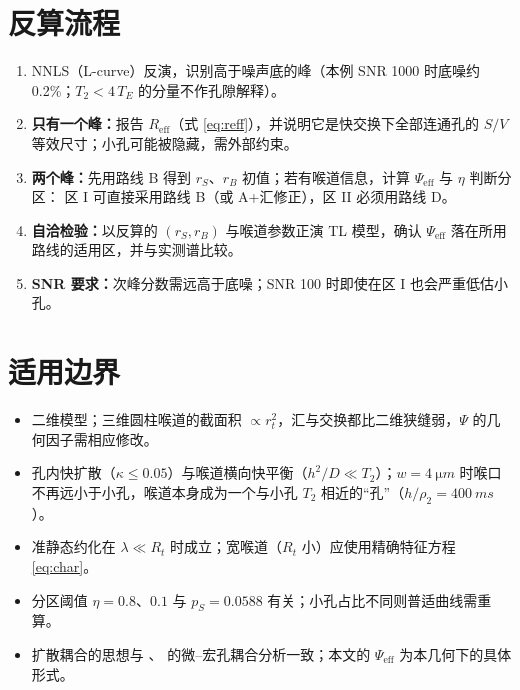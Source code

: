 \documentclass[11pt,a4paper]{article}
\newcommand{\Peff}{\Psi_{\mathrm{eff}}}
\begin{document}
\section{反算流程}
\begin{enumerate}[leftmargin=2em]
\item NNLS（L-curve）反演，识别高于噪声底的峰（本例 SNR 1000 时底噪约 0.2\%；$T_2<4\,T_E$ 的分量不作孔隙解释）。
\item \textbf{只有一个峰：}报告 $R_{\mathrm{eff}}$（式 \eqref{eq:reff}），并说明它是快交换下全部连通孔的 $S/V$ 等效尺寸；小孔可能被隐藏，需外部约束。
\item \textbf{两个峰：}先用路线 B 得到 $r_S$、$r_B$ 初值；若有喉道信息，计算 $\Peff$ 与 $\eta$ 判断分区：
区 I 可直接采用路线 B（或 A+汇修正），区 II 必须用路线 D。
\item \textbf{自洽检验：}以反算的 $(r_S,r_B)$ 与喉道参数正演 TL 模型，确认 $\Peff$ 落在所用路线的适用区，并与实测谱比较。
\item \textbf{SNR 要求：}次峰分数需远高于底噪；SNR 100 时即使在区 I 也会严重低估小孔。
\end{enumerate}

\section{适用边界}
\begin{itemize}[leftmargin=2em]
\item 二维模型；三维圆柱喉道的截面积 $\propto r_t^2$，汇与交换都比二维狭缝弱，$\Psi$ 的几何因子需相应修改。
\item 孔内快扩散（$\kappa\le0.05$）与喉道横向快平衡（$h^2/D\ll T_2$）；$w=\SI{4}{\micro m}$ 时喉口不再远小于小孔，喉道本身成为一个与小孔 $T_2$ 相近的“孔”（$h/\rho_2=\SI{400}{ms}$）。
\item 准静态约化在 $\lambda\ll R_t$ 时成立；宽喉道（$R_t$ 小）应使用精确特征方程 \eqref{eq:char}。
\item 分区阈值 $\eta=0.8$、$0.1$ 与 $p_S=0.0588$ 有关；小孔占比不同则普适曲线需重算。
\item 扩散耦合的思想与 \citet{Ramakrishnan1999}、\citet{AnandHirasaki2007} 的微–宏孔耦合分析一致；本文的 $\Peff$ 为本几何下的具体形式。
\end{itemize}
\end{document}
